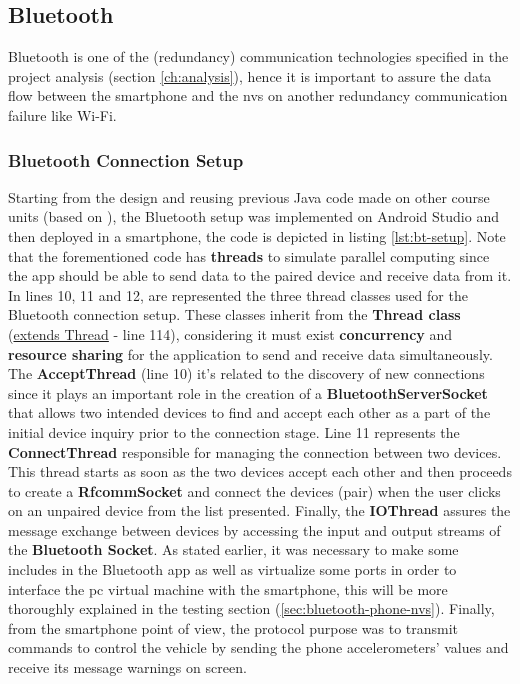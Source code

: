 \subsection{Bluetooth}%
\label{sec:bluetooth-implem}
%
Bluetooth is one of the (redundancy) communication technologies specified in the project analysis (section \ref{ch:analysis}), hence it is important to assure the data flow between the smartphone and the \gls{nvs} on another redundancy communication failure like Wi-Fi. 
%
\subsubsection{Bluetooth Connection Setup}
\label{sec:bluetooth-connection-setup}
Starting from the design and reusing previous Java code made on other course units (based on \cite{btchatsrc}), the Bluetooth setup was implemented on Android Studio and then deployed in a smartphone, the code is depicted in listing \ref{lst:bt-setup}.
%
Note that the forementioned code has \textbf{threads} to simulate parallel computing since the app should be able to send data to the paired device and receive data from it.
%
In lines 10, 11 and 12, are represented the three thread classes used for the Bluetooth connection setup. These classes inherit from the \textbf{Thread class} (\underline{extends Thread} - line 114), considering it must exist \textbf{concurrency} and \textbf{resource sharing} for the application to send and receive data simultaneously. 
%
The \textbf{AcceptThread} (line 10) it's related to the discovery of new connections since it plays an important role in the creation of a \textbf{BluetoothServerSocket} that allows two intended devices to find and accept each other as a part of the initial device inquiry prior to the connection stage. Line 11 represents the \textbf{ConnectThread} responsible for managing the connection between two devices. This thread starts as soon as the two devices accept each other and then proceeds to create a \textbf{RfcommSocket} and connect the devices (pair) when the user clicks on an unpaired device from the list presented. Finally, the \textbf{IOThread} assures the message exchange between devices by accessing the input and output streams of the \textbf{Bluetooth Socket}.
%
As stated earlier, it was necessary to make some includes in the Bluetooth app as well as virtualize some ports in order to interface the \gls{pc} virtual machine with the smartphone, this will be more thoroughly explained in the testing section (\ref{sec:bluetooth-phone-nvs}).
%
Finally, from the smartphone point of view, the protocol purpose was to transmit commands to control the vehicle by sending the phone accelerometers' values and receive its message warnings on screen.\\
%

%


